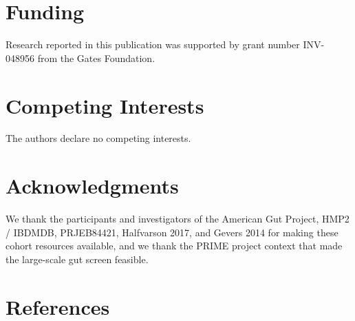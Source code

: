 \documentclass[
  11pt,
]{article}
\newcommand{\paperfundingnote}{Research reported in this publication was supported by grant number INV-048956 from the Gates Foundation.}
\begin{document}
\section{Funding}\label{funding}

\paperfundingnote

\section{Competing Interests}\label{competing-interests}

The authors declare no competing interests.

\section{Acknowledgments}\label{acknowledgments}

We thank the participants and investigators of the American Gut Project,
HMP2 / IBDMDB, PRJEB84421, Halfvarson 2017, and Gevers 2014 for making
these cohort resources available, and we thank the PRIME project context
that made the large-scale gut screen feasible.

\section*{References}\label{references}
\end{document}
